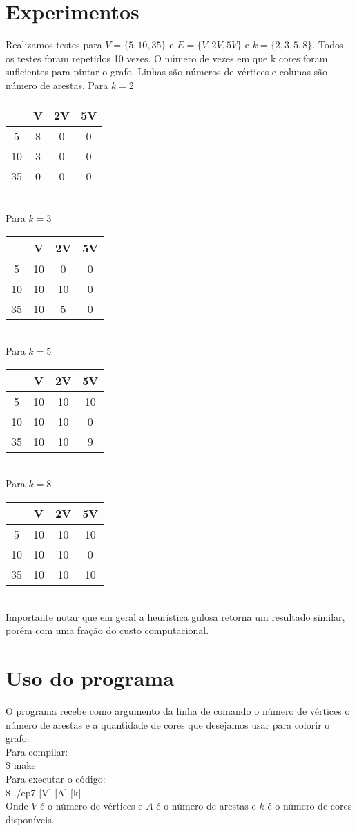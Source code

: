 \documentclass[a4paper]{article}
\theoremstyle{style}
\theoremstyle{proof}
\begin{document}
\section{Experimentos}
Realizamos testes para $V = \{5, 10, 35\}$ e $E = \{V, 2V, 5V\}$ e 
$k = \{2, 3, 5, 8\}$. Todos os testes foram repetidos 10 vezes.
O número de vezes em que k cores foram suficientes para pintar o grafo.
Linhas são números de vértices e colunas são número de arestas.
Para $k = 2$
\begin{tabular} { | c | c | c | c | }
    \hline
       & V & 2V & 5V  \\
    \hline
    5  & 8 & 0  &  0  \\
    \hline
    10 & 3 & 0  &  0  \\
    \hline
    35 & 0 & 0  &  0  \\
    \hline
\end{tabular}
\\Para $k = 3$
\begin{tabular} { | c | c | c | c | }
    \hline
       & V & 2V & 5V  \\
    \hline
    5  & 10 & 0   &  0  \\
    \hline
    10 & 10 & 10  &  0  \\
    \hline
    35 & 10 & 5   &  0  \\
    \hline
\end{tabular}
\\Para $k = 5$
\begin{tabular} { | c | c | c | c | }
    \hline
       & V & 2V & 5V  \\
    \hline
    5  & 10 & 10  & 10  \\
    \hline
    10 & 10 & 10  &  0  \\
    \hline
    35 & 10 & 10  &  9  \\
    \hline
\end{tabular}
\\Para $k = 8$
\begin{tabular} { | c | c | c | c | }
    \hline
       & V & 2V & 5V  \\
    \hline
    5  & 10 & 10  & 10  \\
    \hline
    10 & 10 & 10  &  0  \\
    \hline
    35 & 10 & 10  &  10 \\
    \hline
\end{tabular}
\\Importante  notar que em geral a heurística gulosa retorna um resultado similar, porém
com uma fração do custo computacional.
\section{Uso do programa}
O programa recebe como argumento da linha de comando o número de vértices
o número de arestas e a quantidade de cores que desejamos usar para 
colorir o grafo.
\\Para compilar:
\\\$ make
\\Para executar o código:
\\\$ ./ep7 [V] [A] [k]
\\Onde $V$ é o número de vértices e $A$ é o número de arestas e $k$ é o 
número de cores disponíveis.
\end{document}
